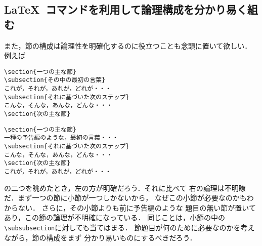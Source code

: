 \documentclass[dvipdfmx,onecolumn]{jsce}  %
\begin{document}
\subsection{\LaTeX\ コマンドを利用して論理構成を分かり易く組む}

また，節の構成は論理性を明確化するのに役立つことも念頭に置いて欲しい．
例えば
\medskip

\noindent
\mbox{}\hfill
\begin{minipage}[t]{.42\textwidth}
\begin{verbatim}
\section{一つの主な節}
\subsection{その中の最初の言葉}
これが，それが，あれが，どれが・・・
\subsection{それに基づいた次のステップ}
こんな，そんな，あんな，どんな・・・
\section{次の主な節}
\end{verbatim}
\end{minipage}
\hfill
\begin{minipage}[t]{.42\textwidth}
\begin{verbatim}
\section{一つの主な節}
一種の予告編のような，最初の言葉・・・
\subsection{それに基づいた次のステップ}
こんな，そんな，あんな，どんな・・・
\section{次の主な節}
これが，それが，あれが，どれが・・・
\end{verbatim}
\end{minipage}
\hfill\mbox{}
\medskip

\noindent
の二つを眺めたとき，左の方が明確だろう．それに比べて
右の論理は不明瞭だ．まず一つの節に小節が一つしかないから，
なぜこの小節が必要なのかもわからない．
さらに，その小節よりも前に予告編のような
題目の無い節が置いてあり，この節の論理が不明確になっている．
同じことは，小節の中の \verb+\subsubsection+に対しても当てはまる．
節題目が何のために必要なのかを考えながら，節の構成をまず
分かり易いものにするべきだろう．
\end{document}
